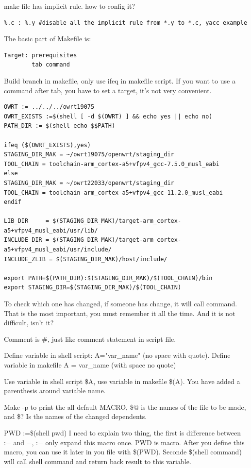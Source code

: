 \documentclass[paper=8.5in:11in, twoside, 12pt, pagesize=pdftex]{book}
\begin{document}
make file has implicit rule. how to config it? 
\begin{verbatim}
%.c : %.y #disable all the implicit rule from *.y to *.c, yacc example
\end{verbatim}		

The basic part of Makefile is:
\begin{verbatim}
Target: prerequisites
		tab command 
\end{verbatim}

Build branch in makefile, only use ifeq in makefile script. If you want to use a command after tab, you have to set a target, it's not very convenient.
\begin{verbatim}
OWRT := ../../../owrt19075   
OWRT_EXISTS :=$(shell [ -d $(OWRT) ] && echo yes || echo no)
PATH_DIR := $(shell echo $$PATH)

ifeq ($(OWRT_EXISTS),yes)
STAGING_DIR_MAK = ~/owrt19075/openwrt/staging_dir
TOOL_CHAIN = toolchain-arm_cortex-a5+vfpv4_gcc-7.5.0_musl_eabi
else
STAGING_DIR_MAK = ~/owrt22033/openwrt/staging_dir
TOOL_CHAIN = toolchain-arm_cortex-a5+vfpv4_gcc-11.2.0_musl_eabi
endif

LIB_DIR		= $(STAGING_DIR_MAK)/target-arm_cortex-a5+vfpv4_musl_eabi/usr/lib/
INCLUDE_DIR	= $(STAGING_DIR_MAK)/target-arm_cortex-a5+vfpv4_musl_eabi/usr/include/
INCLUDE_ZLIB = $(STAGING_DIR_MAK)/host/include/

export PATH=$(PATH_DIR):$(STAGING_DIR_MAK)/$(TOOL_CHAIN)/bin
export STAGING_DIR=$(STAGING_DIR_MAK)/$(TOOL_CHAIN)
\end{verbatim}
														
		To check which one has changed, if someone has change, it will call command. That is the most important, you must remember it all the time.  And it is not difficult, isn't it?

		Comment is \#, just like comment statement in script file.
		
		Define variable in shell script: A="var\_name" (no space with quote). Define variable in makefile A = var\_name (with space no quote)

		Use variable in shell script \$A, use variable in makefile \$(A). You have added a parenthesis around variable name.  
		
		Make -p to print the all default MACRO, \$@ is the names of the file to be made, and \$? Is the names of the changed dependents.

		PWD :=\$(shell pwd) I need to explain two thing, the first is difference between := and =, := only expand this macro once.    PWD is macro. After you define this macro, you can use it later in you file with \$(PWD). Seconde \$(shell command) will call shell command and return back result to this variable. 
\end{document}
